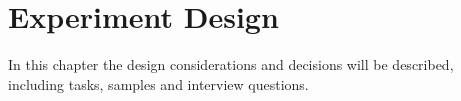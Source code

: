 
\chapter{Experiment Design}
\label{chapter:ExperimentDesign}
In this chapter the design considerations and decisions will be described, including tasks, samples and interview questions.





